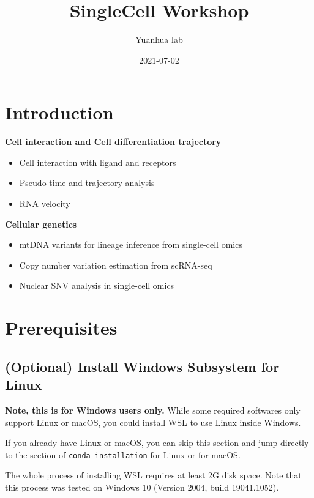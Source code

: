 \documentclass[
]{book}
\title{SingleCell Workshop}
\author{Yuanhua lab}
\date{2021-07-02}
\providecommand{\tightlist}{%
  \setlength{\itemsep}{0pt}\setlength{\parskip}{0pt}}
\begin{document}
\maketitle

{
\setcounter{tocdepth}{1}
\tableofcontents
}
\hypertarget{introduction}{%
\chapter{Introduction}\label{introduction}}

\textbf{Cell interaction and Cell differentiation trajectory}

\begin{itemize}
\tightlist
\item
  Cell interaction with ligand and receptors
\item
  Pseudo-time and trajectory analysis
\item
  RNA velocity
\end{itemize}

\textbf{Cellular genetics}

\begin{itemize}
\tightlist
\item
  mtDNA variants for lineage inference from single-cell omics
\item
  Copy number variation estimation from scRNA-seq
\item
  Nuclear SNV analysis in single-cell omics
\end{itemize}

\hypertarget{env-pre}{%
\chapter{Prerequisites}\label{env-pre}}

\hypertarget{wsl_install}{%
\section{(Optional) Install Windows Subsystem for Linux}\label{wsl_install}}

\textbf{Note, this is for Windows users only.} While some required softwares only support Linux or macOS, you could install WSL to use Linux inside Windows.

If you already have Linux or macOS, you can skip this section and jump directly to the section of \texttt{conda\ installation} \protect\hyperlink{conda_install_linux}{for Linux} or \protect\hyperlink{conda_install_mac}{for macOS}.

The whole process of installing WSL requires at least 2G disk space. Note that this process was tested on Windows 10 (Version 2004, build 19041.1052).
\end{document}
